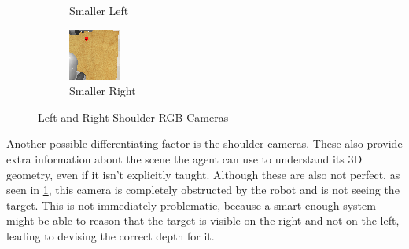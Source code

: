 \begin{figure}[htpb]
\begin{subfigure}{0.2\linewidth}
    \caption{Smaller Left}\label{subfig:smaller-l-shoulder}
  \end{subfigure}
  \begin{subfigure}{0.2\linewidth}
    \centering
    \includegraphics[width=\linewidth]{assets/depth-interfacing/smaller-r_rgb.png}
    \caption{Smaller Right}\label{subfig:smaller-r-shoulder}
  \end{subfigure}
  \caption{Left and Right Shoulder RGB Cameras}\label{fig:di-lr-shoulder}
\end{figure}


Another possible differentiating factor is the shoulder cameras. These also provide extra information about the scene the agent can use to understand its 3D geometry, even if it isn't explicitly taught. Although these are also not perfect, as seen in \ref{subfig:smaller-l-shoulder}, this camera is completely obstructed by the robot and is not seeing the target. This is not immediately problematic, because a smart enough system might be able to reason that the target is visible on the right and not on the left, leading to devising the correct depth for it.

